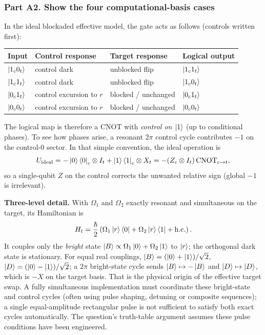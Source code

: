 \subsubsection*{Part A2. Show the four computational-basis cases}
In the ideal blockaded effective model, the gate acts as follows (controls written first):
\begin{center}\small
\begin{tabular}{@{}llll@{}}\toprule
Input&Control response&Target response&Logical output\\\midrule
$\left\lvert 1_c0_t\right\rangle$&control dark&unblocked flip&$\left\lvert 1_c1_t\right\rangle$\\
$\left\lvert 1_c1_t\right\rangle$&control dark&unblocked flip&$\left\lvert 1_c0_t\right\rangle$\\
$\left\lvert 0_c1_t\right\rangle$&control excursion to $r$&blocked / unchanged&$\left\lvert 0_c1_t\right\rangle$\\
$\left\lvert 0_c0_t\right\rangle$&control excursion to $r$&blocked / unchanged&$\left\lvert 0_c0_t\right\rangle$\\\bottomrule
\end{tabular}\end{center}
The logical map is therefore a CNOT with \emph{control on $\left\lvert 1\right\rangle$} (up to conditional phases). To see how phases arise, a resonant $2\pi$ control cycle contributes $-1$ on the control-$0$ sector. In that simple convention, the ideal operation is
\begin{equation}
U_{\rm ideal}= -\left\lvert 0\right\rangle\left\langle 0\right\rvert_c\otimes I_t+\left\lvert 1\right\rangle\left\langle 1\right\rvert_c\otimes X_t
=-(Z_c\otimes I_t)\,\mathrm{CNOT}_{c\rightarrow t},
\end{equation}
so a single-qubit $Z$ on the control corrects the unwanted relative sign (global $-1$ is irrelevant).

\textbf{Three-level detail.} With $\Omega_1$ and $\Omega_2$ exactly resonant and simultaneous on the target, its Hamiltonian is
\begin{equation}H_t=\frac\hbar2\left(\Omega_1\left\lvert r\right\rangle\left\langle 0\right\rvert+\Omega_2\left\lvert r\right\rangle\left\langle 1\right\rvert+\mathrm{h.c.}\right).
\end{equation}
It couples only the \emph{bright} state $\left\lvert B\right\rangle\propto\Omega_1\left\lvert 0\right\rangle+\Omega_2\left\lvert 1\right\rangle$ to $\left\lvert r\right\rangle$; the orthogonal dark state is stationary. For equal real couplings, $\left\lvert B\right\rangle=(\left\lvert 0\right\rangle+\left\lvert 1\right\rangle)/\sqrt2$, $\left\lvert D\right\rangle=(\left\lvert 0\right\rangle-\left\lvert 1\right\rangle)/\sqrt2$; a $2\pi$ bright-state cycle sends $\left\lvert B\right\rangle\mapsto-\left\lvert B\right\rangle$ and $\left\lvert D\right\rangle\mapsto\left\lvert D\right\rangle$, which is $-X$ on the target basis. That is the physical origin of the effective target swap. A fully simultaneous implementation must coordinate these bright-state and control cycles (often using pulse shaping, detuning or composite sequences); a single equal-amplitude rectangular pulse is not sufficient to satisfy both exact cycles automatically. The question's truth-table argument assumes these pulse conditions have been engineered.

